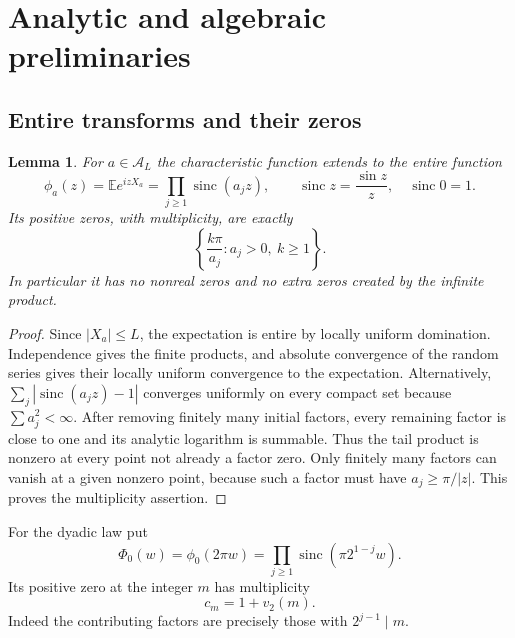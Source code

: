 \documentclass[11pt,a4paper]{article}
\numberwithin{equation}{section}
\newtheorem{lemma}[theorem]{Lemma}
\theoremstyle{definition}
\theoremstyle{remark}
\DeclareMathOperator{\sinc}{sinc}
\newcommand{\E}{\mathbb E}
\newcommand{\A}{\mathcal A}
\begin{document}
\section{Analytic and algebraic preliminaries}
\label{sec:prelim}

\subsection{Entire transforms and their zeros}

\begin{lemma}\label{lem:transform}
For $a\in\A_L$ the characteristic function extends to the entire function
\begin{equation}
 \phi_a(z)=\E e^{izX_a}=\prod_{j\ge1}\sinc(a_jz),
 \qquad \sinc z=\frac{\sin z}{z},\quad\sinc0=1.
 \label{eq:product}
\end{equation}
Its positive zeros, with multiplicity, are exactly
\begin{equation}
 \left\{\frac{k\pi}{a_j}:a_j>0,\ k\ge1\right\}.
 \label{eq:zero-multiset}
\end{equation}
In particular it has no nonreal zeros and no extra zeros created by the
infinite product.
\end{lemma}
\begin{proof}
Since $|X_a|\le L$, the expectation is entire by locally uniform domination.
Independence gives the finite products, and absolute convergence of the random
series gives their locally uniform convergence to the expectation. Alternatively,
$\sum_j|\sinc(a_jz)-1|$ converges uniformly on every compact set because
$\sum a_j^2<\infty$. After removing finitely many initial factors, every
remaining factor is close to one and its analytic logarithm is summable.
Thus the tail product is nonzero at every point not already a factor zero.
Only finitely many factors can vanish at a given nonzero point, because such a
factor must have $a_j\ge\pi/|z|$. This proves the multiplicity assertion.
\end{proof}

For the dyadic law put
\begin{equation}
 \Phi_0(w)=\phi_0(2\pi w)
 =\prod_{j\ge1}\sinc(\pi 2^{1-j}w).
 \label{eq:normalized-transform}
\end{equation}
Its positive zero at the integer $m$ has multiplicity
\begin{equation}
 c_m=1+v_2(m).
 \label{eq:multiplicity}
\end{equation}
Indeed the contributing factors are precisely those with $2^{j-1}\mid m$.
\end{document}
